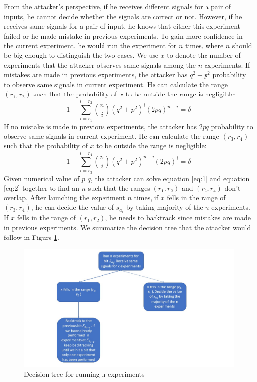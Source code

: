 \documentclass{iacrtrans}
\begin{document}
From the attacker's perspective, if he receives different signals for a pair of inputs, he cannot decide whether the signals are correct or not. However, if he receives same signals for a pair of input, he knows that either this experiment failed or he made mistake in previous experiments. To gain more confidence in the current experiment, he would run the experiment for $n$ times, where $n$ should be big enough to distinguish the two cases. We use $x$ to denote the number of experiments that the attacker observes same signals among the $n$ experiments. If mistakes are made in previous experiments, the attacker has $q^2+p^2$ probability to observe same signals in current experiment. He can calculate the range $(r_1, r_2)$ such that the probability of $x$ to be outside the range is negligible:
\begin{equation} \label{eq:1}
    1- \sum_{i=r_1}^{i=r_2} \binom{n}{i} (q^2+p^2)^i(2pq)^{n-i} = \delta
\end{equation}
If no mistake is made in previous experiments, the attacker has $2pq$ probability to observe same signals in current experiment. He can calculate the range $(r_3, r_4)$ such that the probability of $x$ to be outside the range is negligible:
\begin{equation} \label{eq:2}
    1- \sum_{i=r_3}^{i=r_4} \binom{n}{i} (q^2+p^2)^{n-i}(2pq)^{i} = \delta
\end{equation}
Given numerical value of $p$ $q$, the attacker can solve equation \ref{eq:1} and equation \ref{eq:2} together to find an $n$ such that the ranges $(r_1, r_2)$ and $(r_3, r_4)$ don't overlap. After launching the experiment $n$ times, if $x$ fells in the range of $(r_3, r_4)$, he can decide the value of $s_{a_i}$ by taking majority of the $n$ experiments. If $x$ fells in the range of $(r_1, r_2)$, he needs to backtrack since mistakes are made in previous experiments. We summarize the decision tree that the attacker would follow in Figure \ref{fig:backtrack}.

\begin{figure}[h]
    \centering
    \includegraphics[scale=0.3]{backtrack.jpg}
    \caption{Decision tree for running n experiments}
    \label{fig:backtrack}
\end{figure}
\end{document}
